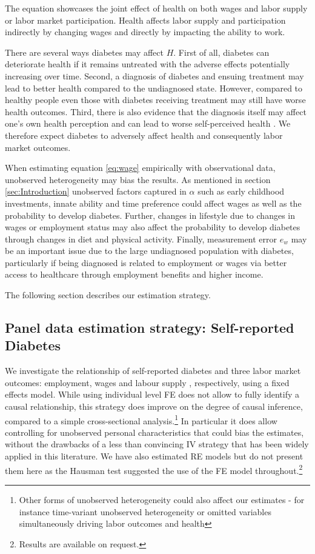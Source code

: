 \documentclass[12pt,english,british]{article}
\begin{document}
The equation showcases the joint effect of health on both wages and labor supply or labor market participation. Health affects labor supply and participation indirectly by changing wages and directly by impacting the ability to work.

There are several ways diabetes may affect $H$. First of all, diabetes can deteriorate health if it remains untreated with the adverse effects potentially increasing over time. Second, a diagnosis of diabetes and ensuing treatment may lead to better health compared to the undiagnosed state. However, compared to healthy people even those with diabetes receiving treatment may still have worse health outcomes. Third, there is also evidence that the diagnosis itself may affect one's own health perception and can lead to worse self-perceived health \citep{Thoolen2006a}. We therefore expect diabetes to adversely affect health and consequently labor market outcomes.

When estimating equation  \ref{eq:wage} empirically with observational data, unobserved heterogeneity may bias the results. As mentioned in section  \ref{sec:Introduction} unobserved factors captured in $\alpha$ such as early childhood investments, innate ability and time preference could affect wages as well as the probability to develop diabetes. Further, changes in lifestyle due to changes in wages or employment status may also affect the probability to develop diabetes through changes in diet and physical activity. Finally, measurement error $e_w$ may be an important issue due to the large undiagnosed population with diabetes, particularly if being diagnosed is related to employment or wages via better access to healthcare through employment benefits and higher income.

The following section describes our estimation strategy.


\subsection{Panel data estimation strategy: Self-reported Diabetes}

We investigate the relationship of self-reported diabetes and three
labor market outcomes: employment, wages and labour supply , respectively, using a fixed effects model. While using individual level \ac{FE} does not allow to fully
identify a causal relationship, this strategy does improve on the degree of causal inference,
compared to a simple cross-sectional analysis.\footnote{Other forms of unobserved heterogeneity could also
affect our estimates - for instance time-variant unobserved heterogeneity
or omitted variables simultaneously driving labor outcomes and health} In particular it
does allow controlling for unobserved personal characteristics that
could bias the estimates, without the drawbacks of a less than convincing
\ac{IV} strategy that has been widely applied in this literature. We have also estimated \ac{RE} models but do not present them here as the Hausman test suggested the use of the \ac{FE} model throughout.\footnote{Results are available on request.}
\end{document}
